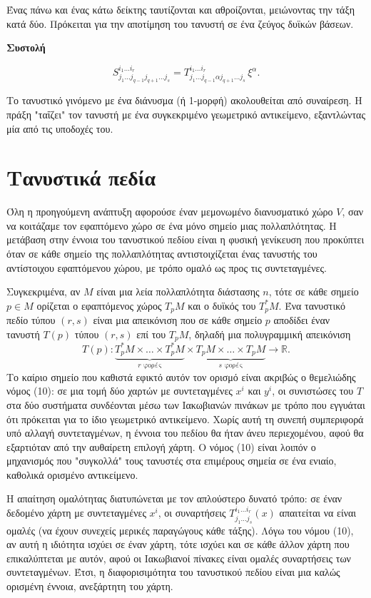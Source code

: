 \documentclass[12pt]{article}
\begin{document}
Ένας πάνω και ένας κάτω δείκτης ταυτίζονται και αθροίζονται, μειώνοντας την τάξη κατά δύο. Πρόκειται για την αποτίμηση του τανυστή σε ένα ζεύγος δυϊκών βάσεων.

\textbf{Συστολή}

\[
S^{i_1 \dots i_r}_{j_1 \dots j_{q-1} j_{q+1} \dots j_s} = T^{i_1 \dots i_r}_{j_1 \dots j_{q-1} \alpha j_{q+1} \dots j_s} \, \xi^\alpha. \tag{13}
\]

Το τανυστικό γινόμενο με ένα διάνυσμα (ή 1-μορφή) ακολουθείται από συναίρεση. Η πράξη "ταΐζει" τον τανυστή με ένα συγκεκριμένο γεωμετρικό αντικείμενο, εξαντλώντας μία από τις υποδοχές του.

\section{Τανυστικά πεδία}

Όλη η προηγούμενη ανάπτυξη αφορούσε έναν μεμονωμένο διανυσματικό χώρο \( V \), σαν να κοιτάζαμε τον εφαπτόμενο χώρο σε ένα μόνο σημείο μιας πολλαπλότητας. Η μετάβαση στην έννοια του τανυστικού πεδίου είναι η φυσική γενίκευση που προκύπτει όταν σε κάθε σημείο της πολλαπλότητας αντιστοιχίζεται ένας τανυστής του αντίστοιχου εφαπτόμενου χώρου, με τρόπο ομαλό ως προς τις συντεταγμένες.

Συγκεκριμένα, αν \( M \) είναι μια λεία πολλαπλότητα διάστασης \( n \), τότε σε κάθε σημείο \( p \in M \) ορίζεται ο εφαπτόμενος χώρος \( T_pM \) και ο δυϊκός του \( T_p^*M \). Ένα τανυστικό πεδίο τύπου \( (r, s) \) είναι μια απεικόνιση που σε κάθε σημείο \( p \) αποδίδει έναν τανυστή \( T(p) \) τύπου \( (r, s) \) επί του \( T_pM \), δηλαδή μια πολυγραμμική απεικόνιση
\[
T(p): \underbrace{T_p^*M \times \dots \times T_p^*M}_{r \text{ φορές}} \times \underbrace{T_pM \times \dots \times T_pM}_{s \text{ φορές}} \to \mathbb{R}.
\]
Το καίριο σημείο που καθιστά εφικτό αυτόν τον ορισμό είναι ακριβώς ο θεμελιώδης νόμος (10): σε μια τομή δύο χαρτών με συντεταγμένες \( x^i \) και \( y^i \), οι συνιστώσες του \( T \) στα δύο συστήματα συνδέονται μέσω των Ιακωβιανών πινάκων με τρόπο που εγγυάται ότι πρόκειται για το ίδιο γεωμετρικό αντικείμενο. Χωρίς αυτή τη συνεπή συμπεριφορά υπό αλλαγή συντεταγμένων, η έννοια του πεδίου θα ήταν άνευ περιεχομένου, αφού θα εξαρτιόταν από την αυθαίρετη επιλογή χάρτη. Ο νόμος (10) είναι λοιπόν ο μηχανισμός που "συγκολλά" τους τανυστές στα επιμέρους σημεία σε ένα ενιαίο, καθολικά ορισμένο αντικείμενο.

Η απαίτηση ομαλότητας διατυπώνεται με τον απλούστερο δυνατό τρόπο: σε έναν δεδομένο χάρτη με συντεταγμένες \( x^i \), οι συναρτήσεις \( T^{i_1 \dots i_r}_{j_1 \dots j_s}(x) \) απαιτείται να είναι ομαλές (να έχουν συνεχείς μερικές παραγώγους κάθε τάξης). Λόγω του νόμου (10), αν αυτή η ιδιότητα ισχύει σε έναν χάρτη, τότε ισχύει και σε κάθε άλλον χάρτη που επικαλύπτεται με αυτόν, αφού οι Ιακωβιανοί πίνακες είναι ομαλές συναρτήσεις των συντεταγμένων. Έτσι, η διαφορισιμότητα του τανυστικού πεδίου είναι μια καλώς ορισμένη έννοια, ανεξάρτητη του χάρτη.
\end{document}
